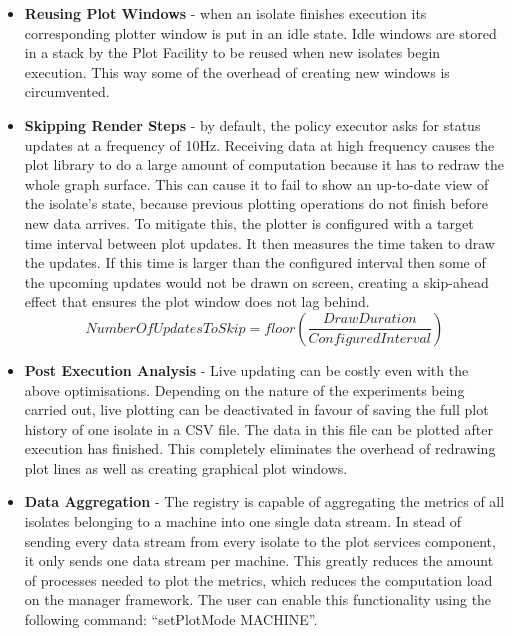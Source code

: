 \documentclass{l4proj}
\begin{document}
\begin{itemize}
\item \textbf{Reusing Plot Windows} - when an isolate finishes execution its corresponding plotter window is put in an idle state. Idle windows are stored in a stack by the Plot Facility to be reused when new isolates begin execution. This way some of the overhead of creating new windows is circumvented. 

\item \textbf{Skipping Render Steps} - by default, the policy executor asks for status updates at a frequency of 10Hz. Receiving data at high frequency causes the plot library to do a large amount of computation because it has to redraw the whole graph surface. This can cause it to fail to show an up-to-date view of the isolate's state, because previous plotting operations do not finish before new data arrives. To mitigate this, the plotter is configured with a target time interval between plot updates. It then measures the time taken to draw the updates. If this time is larger than the configured interval then some of the upcoming updates would not be drawn on screen, creating a skip-ahead effect that ensures the plot window does not lag behind.
\begin{equation}
  \textit{NumberOfUpdatesToSkip} = floor\left(\dfrac{\textit{DrawDuration}}{\textit{ConfiguredInterval}}\right)
\end{equation}

\item \textbf{Post Execution Analysis} - Live updating can be costly even with the above optimisations. Depending on the nature of the experiments being carried out, live plotting can be deactivated in favour of saving the full plot history of one isolate in a CSV file. The data in this file can be plotted after execution has finished. This completely eliminates the overhead of redrawing plot lines as well as creating graphical plot windows. 

\item \textbf{Data Aggregation} - The registry is capable of aggregating the metrics of all isolates belonging to a machine into one single data stream. In stead of sending every data stream from every isolate to the plot services component, it only sends one data stream per machine. This greatly reduces the amount of processes needed to plot the metrics, which reduces the computation load on the manager framework. The user can enable this functionality using the following command: ``setPlotMode MACHINE''.
\end{itemize}
\end{document}
